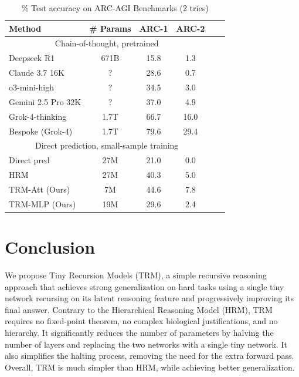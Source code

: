 \documentclass{article}
\newcounter{col}
\newcommand{\highlightgreen}[1]{\colorbox{green!15}{#1}}
\theoremstyle{plain}
\theoremstyle{definition}
\theoremstyle{remark}
\begin{document}
\setlength{\tabcolsep}{4pt} %
\begin{table}[ht]
\caption{\% Test accuracy on ARC-AGI Benchmarks (2 tries)}
\centering
\begin{tabular}{|l|c|c|c|c|c}
\hline
 Method & \# Params & ARC-1 & ARC-2 \\
\hline
\multicolumn{4}{|c|}{Chain-of-thought, pretrained} \\
\hline
Deepseek R1 & 671B & 15.8 & 1.3 \\
Claude 3.7 16K & ? & 28.6 & 0.7 \\
o3-mini-high & ? & 34.5 & 3.0 \\
Gemini 2.5 Pro 32K & ? & 37.0 & 4.9 \\
Grok-4-thinking & 1.7T & 66.7 & 16.0 \\
Bespoke (Grok-4) & 1.7T & \highlightgreen{79.6} & \highlightgreen{29.4} \\
\hline
\multicolumn{4}{|c|}{Direct prediction, small-sample training} \\ 
\hline
Direct pred & 27M & 21.0 & 0.0 \\
HRM & 27M & 40.3 & 5.0 \\
\hdashline
TRM-Att (Ours) & 7M & \highlightgreen{44.6} & \highlightgreen{7.8} \\
TRM-MLP (Ours) & 19M & 29.6 & 2.4 \\
\hline
\end{tabular}
\label{tab:arcgagi}
\end{table}
\setlength{\tabcolsep}{6pt} %

\section{Conclusion}

We propose Tiny Recursion Models (TRM), a simple recursive reasoning approach that achieves strong generalization on hard tasks using a single tiny network recursing on its latent reasoning feature and progressively improving its final answer. Contrary to the Hierarchical Reasoning Model (HRM), TRM requires no fixed-point theorem, no complex biological justifications, and no hierarchy. It significantly reduces the number of parameters by halving the number of layers and replacing the two networks with a single tiny network. It also simplifies the halting process, removing the need for the extra forward pass. Overall, TRM is much simpler than HRM, while achieving better generalization.
\end{document}
